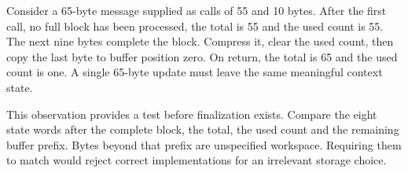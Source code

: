 Consider a 65-byte message supplied as calls of 55 and 10 bytes. After the first call,
no full block has been processed, the total is 55 and the used count is 55. The next
nine bytes complete the block. Compress it, clear the used count, then copy the last
byte to buffer position zero. On return, the total is 65 and the used count is one.
A single 65-byte update must leave the same meaningful context state.

This observation provides a test before finalization exists. Compare the eight state
words after the complete block, the total, the used count and the remaining buffer
prefix. Bytes beyond that prefix are unspecified workspace. Requiring them to match
would reject correct implementations for an irrelevant storage choice.

